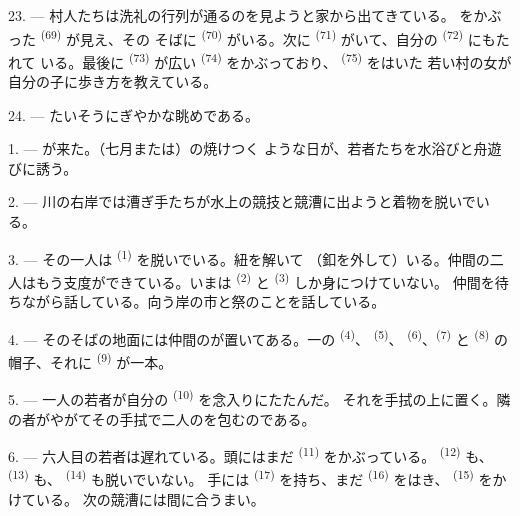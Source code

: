 23. --- 村人たちは洗礼の行列が通るのを見ようと家から出てきている。
をかぶった \textsuperscript{(69)} が見え、その
そばに \textsuperscript{(70)} がいる。次に
\textsuperscript{(71)} がいて、自分の \textsuperscript{(72)} にもたれて
いる。最後に \textsuperscript{(73)} が広い
\textsuperscript{(74)} をかぶっており、 \textsuperscript{(75)} をはいた
若い村の女が自分の子に歩き方を教えている。

24. --- たいそうにぎやかな眺めである。
\VUsaut{4.0mm}

\VUsaut{3.0mm}

\VUsaut{2.4mm}

\VUsaut{3.0mm}

1. --- が来た。（七月または）の焼けつく
ような日が、若者たちを水浴びと舟遊びに誘う。

2. --- 川の右岸では漕ぎ手たちが水上の競技と競漕に出ようと着物を脱いでいる。

3. --- その一人は \textsuperscript{(1)} を脱いでいる。紐を解いて
（釦を外して）いる。仲間の二人はもう支度ができている。いまは
\textsuperscript{(2)} と \textsuperscript{(3)} しか身につけていない。
仲間を待ちながら話している。向う岸の市と祭のことを話している。

4. --- そのそばの地面には仲間のが置いてある。一の
 \textsuperscript{(4)}、 \textsuperscript{(5)}、
 \textsuperscript{(6)}、\textsuperscript{(7)} と
 \textsuperscript{(8)} の帽子、それに
\textsuperscript{(9)} が一本。

5. --- 一人の若者が自分の \textsuperscript{(10)} を念入りにたたんだ。
それを手拭の上に置く。隣の者がやがてその手拭で二人のを包むのである。

6. --- 六人目の若者は遅れている。頭にはまだ \textsuperscript{(11)}
をかぶっている。 \textsuperscript{(12)} も、
\textsuperscript{(13)} も、 \textsuperscript{(14)} も脱いでいない。
手には \textsuperscript{(17)} を持ち、まだ
\textsuperscript{(16)} をはき、 \textsuperscript{(15)} をかけている。
次の競漕には間に合うまい。

